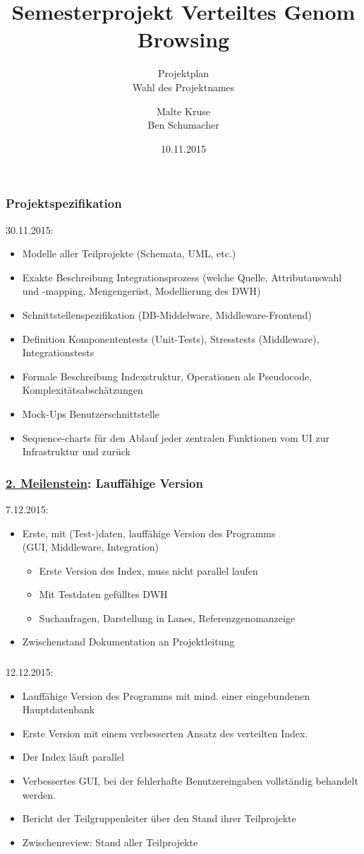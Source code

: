 \documentclass{beamer}
\title[VGB]{Semesterprojekt Verteiltes Genom Browsing}
\subtitle{Projektplan\\Wahl des Projektnames}
\author[Kruse,Schumacher]{Malte Kruse\\Ben Schumacher}
\institute{Institut für Informatik\\Humboldt-Universität zu Berlin}
\date{10.11.2015}
\begin{document}
\begin{frame}
	\titlepage
\end{frame}

\begin{frame}
	\frametitle{Projektspezifikation}
	30.11.2015:
	\begin{itemize}
	  \item Modelle aller Teilprojekte (Schemata, UML, etc.) 
	  \item Exakte Beschreibung Integrationsprozess (welche Quelle, Attributauswahl und -mapping,  Mengengerüst, Modellierung des DWH)
	  \item Schnittstellenspezifikation (DB-Middelware, Middleware-Frontend)
	  \item Definition Komponententests (Unit-Tests), Stresstests (Middleware), Integrationstests
	  \item Formale Beschreibung Indexstruktur, Operationen als Pseudocode, Komplexitätsabschätzungen
	  \item Mock-Ups Benutzerschnittstelle
	  \item Sequence-charts für den Ablauf jeder zentralen Funktionen vom UI zur Infrastruktur und zurück
	\end{itemize}
\end{frame}

\begin{frame}
	\frametitle{\underline{2. Meilenstein}: Lauffähige Version}
	7.12.2015:
\begin{itemize}
 \item Erste, mit (Test-)daten, lauffähige Version des Programms\\
 (GUI, Middleware, Integration)
  \begin{itemize} 
   \item Erste Version des Index, muss nicht parallel laufen
   \item Mit Testdaten gefülltes DWH
   \item Suchanfragen, Darstellung in Lanes, Referenzgenomanzeige
  \end{itemize}
 \item Zwischenstand Dokumentation an Projektleitung
\end{itemize}
\end{frame}

\begin{frame}
 \frametitle{}
 12.12.2015:
 \begin{itemize}
  \item Lauffähige Version des Programms mit mind. einer eingebundenen Hauptdatenbank
  \item Erste Version mit einem verbesserten Ansatz des verteilten Index.
  \item Der Index läuft parallel 
  \item Verbessertes GUI, bei der fehlerhafte Benutzereingaben vollständig behandelt werden.
  \item Bericht der Teilgruppenleiter über den Stand ihrer Teilprojekte
  \item Zwischenreview: Stand aller Teilprojekte 
 \end{itemize}
\end{frame}
\end{document}
